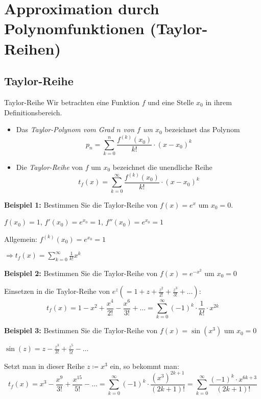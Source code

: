 \section{Approximation durch Polynomfunktionen (Taylor-Reihen)}\label{sec:approximation-durch-polynomfunktionen}

\subsection{Taylor-Reihe}\label{subsec:taylor-reihe}

\begin{definition}{Taylor-Reihe}
    Wir betrachten eine Funktion $f$ und eine Stelle $x_0$ in ihrem Definitionsbereich.
    \begin{itemize}
        \item Das \emph{Taylor-Polynom vom Grad $n$ von $f$ um $x_0$} bezeichnet das Polynom \[p_n = \sum_{k=0}^{n} \frac{f^{(k)} (x_0)}{k!} \cdot (x - x_0)^k\]
        \item Die \emph{Taylor-Reihe} von $f$ um $x_0$ bezeichnet die unendliche Reihe \[t_f(x) = \sum_{k=0}^{\infty} \frac{f^{(k)} (x_0)}{k!} \cdot (x - x_0)^k\]
    \end{itemize}
\end{definition}

\textbf{Beispiel 1:} Bestimmen Sie die Taylor-Reihe von $f(x) = e^x$ um $x_0 = 0$.

$f(x_0) = 1$, $f'(x_0) = e^{x_0} = 1$, $f''(x_0) = e^{x_0} = 1$

Allgemein: $f^{(k)}(x_0) = e^{x_0} = 1$

$\Rightarrow t_f(x) = \sum_{k=0}^{\infty} \frac{1}{k!} x^k$

\textbf{Beispiel 2:} Bestimmen Sie die Taylor-Reihe von $f(x) = e^{-x^2}$ um $x_0 = 0$

Einsetzen in die Taylor-Reihe von $e^z \left(= 1 + z + \frac{z^2}{2!} + \frac{z^3}{3!} + \dots \right)$: \[t_f(x) = 1 - x^2 + \frac{x^4}{2!} - \frac{x^6}{3!} + \dots = \sum_{k=0}^{\infty} (-1)^k \cdot \frac{1}{k!} \cdot x^{2k}\]

\textbf{Beispiel 3:} Bestimmen Sie die Taylor-Reihe von $f(x) = \sin(x^3)$ um $x_0 = 0$

$\sin(z) = z - \frac{z^3}{3!} + \frac{z^5}{5!} - \dots$

Setzt man in dieser Reihe $z \coloneqq x^3$ ein, so bekommt man: \[t_f(x) = x^3 - \frac{x^9}{3!} + \frac{x^{15}}{5!} - \dots = \sum_{k=0}^{\infty} (-1)^k \cdot \frac{(x^3)^{2k+1}}{(2k + 1)!} = \sum_{k=0}^{\infty} \frac{(-1)^k \cdot x^{6k + 3}}{(2k + 1)!}\]

